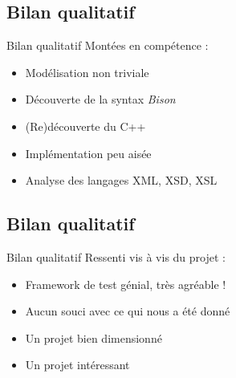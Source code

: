 \documentclass[aspectratio=169]{beamer}
\begin{document}
\subsection{Bilan qualitatif}
\begin{frame}{Bilan qualitatif}
Montées en compétence :
\begin{itemize}
 \item Modélisation non triviale
 \item Découverte de la syntax \textit{Bison}
 \item (Re)découverte du C++
 \item Implémentation peu aisée
 \item Analyse des langages XML, XSD, XSL
\end{itemize}
\end{frame}

\subsection{Bilan qualitatif}
\begin{frame}{Bilan qualitatif}
Ressenti vis à vis du projet :
 \begin{itemize}
  \item Framework de test génial, très agréable !
  \item Aucun souci avec ce qui nous a été donné
  \item Un projet bien dimensionné
  \item Un projet intéressant
 \end{itemize}
\end{frame}
\end{document}
